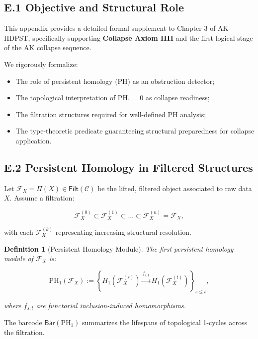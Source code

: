 \documentclass[11pt]{article}
\newtheorem{definition}[theorem]{Definition}
\begin{document}
\subsection*{E.1 Objective and Structural Role}

This appendix provides a detailed formal supplement to Chapter 3 of AK-HDPST, specifically supporting \textbf{Collapse Axiom IIII} and the first logical stage of the AK collapse sequence.

We rigorously formalize:

\begin{itemize}
    \item The role of persistent homology (PH) as an obstruction detector;
    \item The topological interpretation of \( \mathrm{PH}_1 = 0 \) as collapse readiness;
    \item The filtration structures required for well-defined PH analysis;
    \item The type-theoretic predicate guaranteeing structural preparedness for collapse application.
\end{itemize}

\subsection*{E.2 Persistent Homology in Filtered Structures}

Let \( \mathcal{F}_X = \Pi(X) \in \mathsf{Filt}(\mathcal{C}) \) be the lifted, filtered object associated to raw data \( X \). Assume a filtration:

\[
\mathcal{F}_X^{(0)} \subset \mathcal{F}_X^{(1)} \subset \ldots \subset \mathcal{F}_X^{(n)} = \mathcal{F}_X,
\]

with each \( \mathcal{F}_X^{(k)} \) representing increasing structural resolution.

\begin{definition}[Persistent Homology Module]
The first persistent homology module of \( \mathcal{F}_X \) is:

\[
\mathrm{PH}_1(\mathcal{F}_X) := \left\{ H_1\left(\mathcal{F}_X^{(s)}\right) \xrightarrow{f_{s,t}} H_1\left(\mathcal{F}_X^{(t)}\right) \right\}_{s \leq t},
\]

where \( f_{s,t} \) are functorial inclusion-induced homomorphisms.
\end{definition}

The barcode \( \mathsf{Bar}(\mathrm{PH}_1) \) summarizes the lifespans of topological 1-cycles across the filtration.
\end{document}
